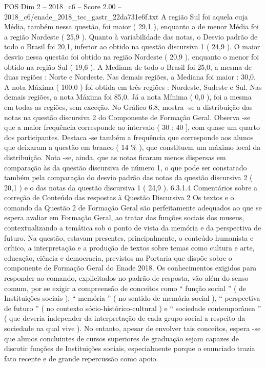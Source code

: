 \begin{textsample}{POS Dim 2 – 2018\_c6 – Score 2.00 – 2018\_c6/enade\_2018\_tec\_gastr\_22da731e6f.txt}
A região Sul foi aquela cuja Média, também nessa questão, foi maior ( 29,1 ), enquanto a de menor Média foi a região Nordeste ( 25,9 ).
Quanto à variabilidade das notas, o Desvio padrão de todo o Brasil foi 20,1, inferior ao obtido na questão discursiva 1 ( 24,9 ).
O maior desvio nessa questão foi obtido na região Nordeste ( 20,9 ), enquanto o menor foi obtido na região Sul ( 19,6 ).
A Mediana de todo o Brasil foi 25,0, a mesma de duas regiões : Norte e Nordeste.
Nas demais regiões, a Mediana foi maior : 30,0.
A nota Máxima ( 100,0 ) foi obtida em três regiões : Nordeste, Sudeste e Sul.
Nas demais regiões, a nota Máxima foi 85,0.
Já a nota Mínima ( 0,0 ), foi a mesma em todas as regiões, sem exceção.
No Gráfico 6.8, mostra -se a distribuição das notas na questão discursiva 2 do Componente de Formação Geral.
Observa -se que a maior frequência corresponde ao intervalo ( 30 ; 40 ], com quase um quarto dos participantes.
Destaca -se também a frequência que corresponde aos alunos que deixaram a questão em branco ( 14 \% ), que constituem um máximo local da distribuição.
Nota -se, ainda, que as notas ficaram menos dispersas em comparação às da questão discursiva de número 1, o que pode ser constatado também pela comparação do desvio padrão das notas da questão discursiva 2 ( 20,1 ) e o das notas da questão discursiva 1 ( 24,9 ). 6.3.1.4 Comentários sobre a correção de Conteúdo das respostas à Questão Discursiva 2 Os textos e o comando da Questão 2 de Formação Geral são perfeitamente adequados ao que se espera avaliar em Formação Geral, ao tratar das funções sociais dos museus, contextualizando a temática sob o ponto de vista da memória e da perspectiva de futuro.
Na questão, estavam presentes, principalmente, o conteúdo humanista e crítico, a interpretação e a produção de textos sobre temas como cultura e arte, educação, ciência e democracia, previstos na Portaria que dispõe sobre o componente de Formação Geral do Enade 2018.
Os conhecimentos exigidos para responder ao comando, explicitados no padrão de resposta, vão além do senso comum, por se exigir a compreensão de conceitos como “ função social ” ( de Instituições sociais ), “ memória ” ( no sentido de memória social ), “ perspectiva de futuro ” ( no contexto sócio-histórico-cultural ) e “ sociedade contemporânea ” ( que deveria independer da interpretação de cada grupo social a respeito da sociedade na qual vive ).
No entanto, apesar de envolver tais conceitos, espera -se que alunos concluintes de cursos superiores de graduação sejam capazes de discutir funções de Instituições sociais, especialmente porque o enunciado trazia fato recente e de grande repercussão como apoio.

\end{textsample}
